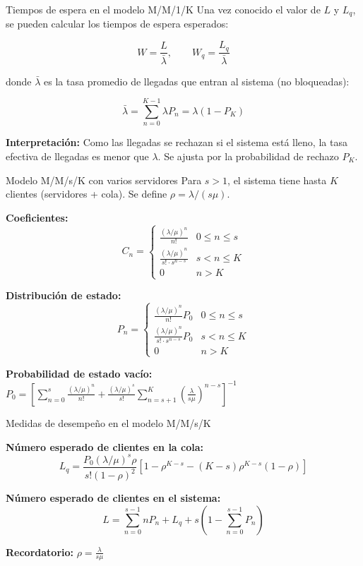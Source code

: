 \documentclass{beamer}
\begin{document}
\begin{frame}{Tiempos de espera en el modelo M/M/1/K}
\justifying
Una vez conocido el valor de $L$ y $L_q$, se pueden calcular los tiempos de espera esperados:

\[
W = \frac{L}{\bar{\lambda}}, \qquad
W_q = \frac{L_q}{\bar{\lambda}}
\]

\medskip
donde $\bar{\lambda}$ es la tasa promedio de llegadas que entran al sistema (no bloqueadas):

\[
\bar{\lambda} = \sum_{n=0}^{K-1} \lambda P_n = \lambda (1 - P_K)
\]

\medskip
\textbf{Interpretación:} Como las llegadas se rechazan si el sistema está lleno, la tasa efectiva de llegadas es menor que $\lambda$. Se ajusta por la probabilidad de rechazo \( P_K \).
\end{frame}

\begin{frame}{Modelo M/M/s/K con varios servidores}
\justifying
Para \( s > 1 \), el sistema tiene hasta $K$ clientes (servidores + cola). Se define \( \rho = \lambda / (s\mu) \).

\medskip
\textbf{Coeficientes:}
\[
C_n =
\begin{cases}
\displaystyle \frac{(\lambda/\mu)^n}{n!} & 0 \leq n \leq s \\
\displaystyle \frac{(\lambda/\mu)^n}{s! \cdot s^{n - s}} & s < n \leq K \\
0 & n > K
\end{cases}
\]

\textbf{Distribución de estado:}
\[
P_n =
\begin{cases}
\displaystyle \frac{(\lambda/\mu)^n}{n!} P_0 & 0 \leq n \leq s \\
\displaystyle \frac{(\lambda/\mu)^n}{s! \cdot s^{n - s}} P_0 & s < n \leq K \\
0 & n > K
\end{cases}
\]

\textbf{Probabilidad de estado vacío:} \(\displaystyle P_0 = \left[ \sum_{n=0}^{s} \frac{(\lambda/\mu)^n}{n!} + \frac{(\lambda/\mu)^s}{s!} \sum_{n=s+1}^{K} \left( \frac{\lambda}{s\mu} \right)^{n - s}
\right]^{-1} \)

\end{frame}

\begin{frame}{Medidas de desempeño en el modelo M/M/s/K}
\justifying

\textbf{Número esperado de clientes en la cola:}
\[
L_q = \frac{P_0 (\lambda/\mu)^s \rho}{s! (1 - \rho)^2}
\left[ 1 - \rho^{K - s} - (K - s)\rho^{K - s}(1 - \rho) \right]
\]

\medskip
\textbf{Número esperado de clientes en el sistema:}
\[
L = \sum_{n=0}^{s-1} n P_n + L_q + s \left( 1 - \sum_{n=0}^{s-1} P_n \right)
\]

\medskip
\textbf{Recordatorio:} \( \rho = \frac{\lambda}{s\mu} \)
\end{frame}
\end{document}
